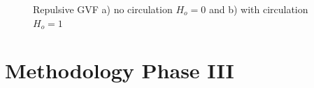 \documentclass[numbered,pdftex]{ohio-etd}
\begin{document}
\begin{figure}[H]
	\begin{subfigmatrix}{2}%
		\centering	
		\hspace*{0mm}
	\end{subfigmatrix}
	\caption{Repulsive GVF a) no circulation $H_o=0$ and b) with circulation $H_o=1$}
	\label{fig:decayApplied}
\end{figure} 


\chapter{Methodology Phase III}
\end{document}
